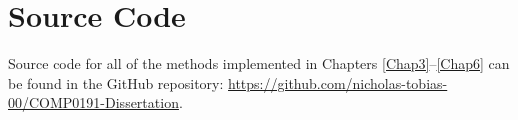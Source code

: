 \chapter{Source Code}
\label{app:source-code}
\label{System Requirements}

Source code for all of the methods implemented in Chapters
\ref{Chap3}--\ref{Chap6} can be found in the GitHub repository:
\newline
\url{https://github.com/nicholas-tobias-00/COMP0191-Dissertation}.
